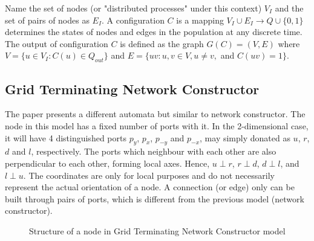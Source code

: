 \par
Name the set of nodes (or "distributed processes" under this context) $V_{I}$ and the set of pairs of nodes as $E_{I}$.
A configuration $C$ is a mapping $ V_{I} \cup E_{I} \to Q \cup \{0,1\} $ determines the states of nodes and edges in the population at any discrete time.
The output of configuration $C$ is defined as the graph $G(C) = (V, E) $ where $V = \{u \in V_{I}: C(u) \in Q_{out}\}$
and  $E = \{uv: u, v \in V, u \not= v,$ and $C(uv) = 1\}$.

\subsection{Grid Terminating Network Constructor \cite{Mi17} \label{IntroToGrid}}
\par
The paper \cite{Mi17} presents a different automata but similar to network constructor. The node in this
model has a fixed number of ports with it. In the 2-dimensional case, it will have 4 distinguished ports
$p_{y}$, $p_{x}$, $p_{-y}$ and $p_{-x}$, may simply donated as $u$, $r$, $d$ and $l$, respectively.
The ports which neighbour with each other are also perpendicular to each other, forming local axes. Hence,
$ u \perp r $, $ r \perp d $, $ d \perp l $, and  $ l \perp u $. The coordinates are only for local purposes and
do not necessarily represent the actual orientation of a node. A connection (or edge) only can be built through
pairs of ports, which is different from the previous model (network constructor).

\par
\begin{figure}[H]
\begin{center}
\end{center}
\caption{Structure of a node in Grid Terminating Network Constructor model}
\end{figure}

\par
